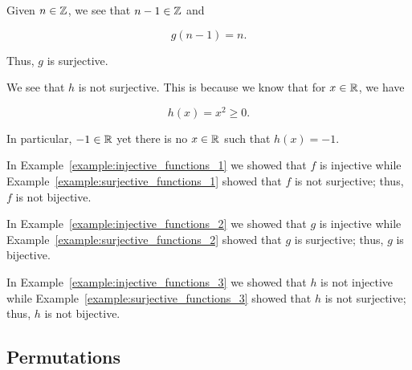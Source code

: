 \begin{example}
\label{example:surjective_functions_2}
Given $n\in\mathbb{Z}$, we see that $n-1\in\mathbb{Z}$ and

\begin{equation}
    g(n-1) = n.
\end{equation}

\noindent
Thus, $g$ is \gls{surjective}.
\end{example}

\begin{example}
\label{example:surjective_functions_3}
We see that $h$ is not \gls{surjective}.
This is because we know that for $x\in\mathbb{R}$, we have

\begin{equation}
    h(x) = x^{2}\ge0.
\end{equation}

\noindent
In particular, $-1\in\mathbb{R}$ yet there is no $x\in\mathbb{R}$ such that $h(x) = -1$.
\end{example}



\begin{example}
\label{example:bijective_functions_1}
In Example~\ref{example:injective_functions_1}
we showed that $f$ is \gls{injective}
while Example~\ref{example:surjective_functions_1}
showed that $f$ is not \gls{surjective};
thus, $f$ is not \gls{bijective}.
\end{example}

\begin{example}
\label{example:bijective_functions_2}
In Example~\ref{example:injective_functions_2}
we showed that $g$ is \gls{injective}
while Example~\ref{example:surjective_functions_2}
showed that $g$ is \gls{surjective};
thus, $g$ is \gls{bijective}.
\end{example}

\begin{example}
\label{example:bijective_functions_3}
In Example~\ref{example:injective_functions_3}
we showed that $h$ is not \gls{injective}
while Example~\ref{example:surjective_functions_3}
showed that $h$ is not \gls{surjective};
thus, $h$ is not \gls{bijective}.
\end{example}



\subsection{Permutations}


